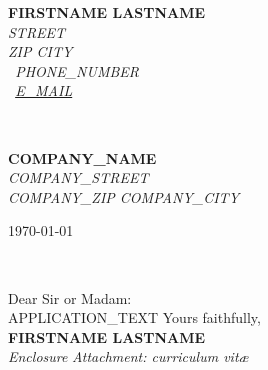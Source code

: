 \documentclass[11pt]{article}
\begin{document}
\rmfamily  %
\hfill%
\begin{minipage}[t]{.6\textwidth}
\raggedleft%
{\bfseries {{FIRSTNAME}} {{LASTNAME}}}\\[.35ex]
\small\itshape%
{{STREET}} \\
{{ZIP}} {{CITY}}\\[.35ex]
\Telefon~{{PHONE_NUMBER}}\\
\Letter~\href{mailto:{{E_MAIL}}}{{{E_MAIL}}}
\end{minipage}\\[1em]
%
\begin{minipage}[t]{.4\textwidth}
\raggedright%
{\bfseries {{COMPANY_NAME}}}\\[.35ex]
\small\itshape%
{{COMPANY_STREET}}\\
{{COMPANY_ZIP}} {{COMPANY_CITY}}
\end{minipage}
\hfill %
\begin{minipage}[t]{.4\textwidth}
\raggedleft %
\today
\end{minipage}\\[2em]
\raggedright
Dear Sir or Madam:\\[1.5em]

{{APPLICATION_TEXT}}
Yours faithfully,\\[2em] %
%
{\bfseries {{FIRSTNAME}} {{LASTNAME}}}\\
%
\vfill%
{\slshape Enclosure}
{\slshape Attachment: curriculum vit\ae{}}
\end{document}
